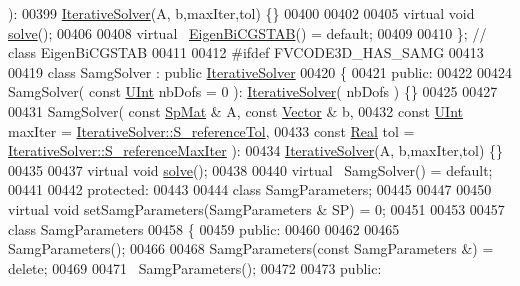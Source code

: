 \begin{DoxyCode}
       ):
00399         \hyperlink{classFVCode3D_1_1IterativeSolver}{IterativeSolver}(A, b,maxIter,tol) \{\}
00400 
00402 
00405     \textcolor{keyword}{virtual} \textcolor{keywordtype}{void} \hyperlink{classFVCode3D_1_1Solver_afefcde44126886bafbc85ca0ce22dca8}{solve}();
00406 
00408     \textcolor{keyword}{virtual} ~\hyperlink{classFVCode3D_1_1EigenBiCGSTAB}{EigenBiCGSTAB}() = \textcolor{keywordflow}{default};
00409 
00410 \}; \textcolor{comment}{// class EigenBiCGSTAB}
00411 
00412 \textcolor{preprocessor}{#ifdef FVCODE3D\_HAS\_SAMG}
00413 
00419 \textcolor{keyword}{class }SamgSolver : \textcolor{keyword}{public} \hyperlink{classFVCode3D_1_1IterativeSolver}{IterativeSolver}
00420 \{
00421 \textcolor{keyword}{public}:
00422 
00424     SamgSolver( \textcolor{keyword}{const} \hyperlink{namespaceFVCode3D_a4bf7e328c75d0fd504050d040ebe9eda}{UInt} nbDofs = 0 ): \hyperlink{classFVCode3D_1_1IterativeSolver}{IterativeSolver}( nbDofs ) \{\}
00425 
00427 
00431     SamgSolver( \textcolor{keyword}{const} \hyperlink{namespaceFVCode3D_ac1032289d96638cf0ad6c52ef639095f}{SpMat} & A, \textcolor{keyword}{const} \hyperlink{namespaceFVCode3D_a16ccf345652402bccd1a5d2e6782526c}{Vector} & b,
00432                 \textcolor{keyword}{const} \hyperlink{namespaceFVCode3D_a4bf7e328c75d0fd504050d040ebe9eda}{UInt} maxIter = \hyperlink{classFVCode3D_1_1IterativeSolver_a2afd68f254311907309444138d7f1b89}{IterativeSolver::S\_referenceTol},
00433                 \textcolor{keyword}{const} \hyperlink{namespaceFVCode3D_a40c1f5588a248569d80aa5f867080e83}{Real} tol = \hyperlink{classFVCode3D_1_1IterativeSolver_a938effdbfaa21c23226bfedf904787c2}{IterativeSolver::S\_referenceMaxIter}
       ):
00434         \hyperlink{classFVCode3D_1_1IterativeSolver}{IterativeSolver}(A, b,maxIter,tol) \{\}
00435 
00437     \textcolor{keyword}{virtual} \textcolor{keywordtype}{void} \hyperlink{classFVCode3D_1_1Solver_afefcde44126886bafbc85ca0ce22dca8}{solve}();
00438 
00440     \textcolor{keyword}{virtual} ~SamgSolver() = \textcolor{keywordflow}{default};
00441 
00442 \textcolor{keyword}{protected}:
00443 
00444     \textcolor{keyword}{class }SamgParameters;
00445 
00447 
00450     \textcolor{keyword}{virtual} \textcolor{keywordtype}{void} setSamgParameters(SamgParameters & SP) = 0;
00451 
00453 
00457     \textcolor{keyword}{class }SamgParameters
00458     \{
00459     \textcolor{keyword}{public}:
00460 
00462 
00465         SamgParameters();
00466 
00468         SamgParameters(\textcolor{keyword}{const} SamgParameters &) = \textcolor{keyword}{delete};
00469 
00471         ~SamgParameters();
00472 
00473     \textcolor{keyword}{public}:

\end{DoxyCode}
